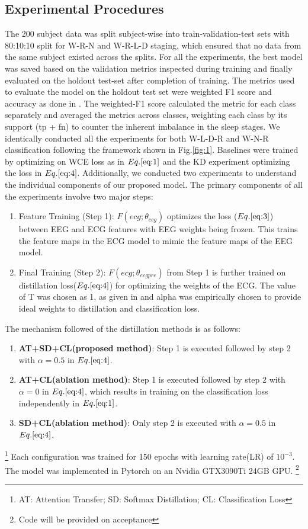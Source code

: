 \documentclass[letterpaper, 10 pt, conference]{ieeeconf}
\begin{document}
\subsection{Experimental Procedures}
The 200 subject data was split subject-wise into train-validation-test sets with 80:10:10 split for W-R-N and W-R-L-D staging, which ensured that no data from the same subject existed across the splits. For all the experiments, the best model was saved based on the validation metrics inspected during training and finally evaluated on the holdout test-set after completion of training. The metrics used to evaluate the model on the holdout test set were weighted F1 score and accuracy as done in \cite{perslev2019u}. The weighted-F1 score calculated the metric for each class separately and averaged the metrics across classes, weighting each class by its support (tp + fn) to counter the inherent imbalance in the sleep stages. We identically conducted all the experiments for both W-L-D-R and W-N-R classification following the framework shown in Fig.\ref{fig:1}. Baselines were trained by optimizing on WCE loss as in $Eq.\ref{eq:1}$ and the KD experiment optimizing the loss in $Eq.\ref{eq:4}$. Additionally, we conducted two experiments to understand the individual components of our proposed model. The primary components of all the experiments involve two major steps:
\begin{enumerate}
    \item Feature Training (Step 1): $F(ecg; \theta_{ecg})$ optimizes the loss ($Eq.\ref{eq:3}$) between EEG and ECG features with EEG weights being frozen. This trains the feature maps in the ECG model to mimic the feature maps of the EEG model.
    \item Final Training (Step 2): $F(ecg;\theta_{ecgpre})$ from Step 1 is further trained on distillation loss($Eq.\ref{eq:4}$) for optimizing the weights of the ECG. The value of T was chosen as 1, as given in \cite{hinton2015distilling} and alpha was empirically chosen to provide ideal weights to distillation and classification loss.
\end{enumerate}
The mechanism followed of the distillation methods is as follows:

\begin{enumerate}
    \item \textbf{AT+SD+CL(proposed method)}: Step 1 is executed followed by step 2 with $ \alpha = 0.5$ in $Eq.\ref{eq:4}$.
    \item \textbf{AT+CL(ablation method)}: Step 1 is executed followed by step 2 with $ \alpha = 0$ in $Eq.\ref{eq:4}$, which results in training on the classification loss independently in $Eq.\ref{eq:1}$.
    \item \textbf{SD+CL(ablation method)}: Only step 2 is executed with $ \alpha = 0.5$ in $Eq.\ref{eq:4}$.
\end{enumerate}
\footnote{AT: Attention Transfer; SD: Softmax Distillation; CL: Classification Loss}
Each configuration was trained for 150 epochs with learning  rate(LR) of $10^{-3}$. The model was implemented in Pytorch on an Nvidia GTX3090Ti 24GB GPU. 
\footnote{Code will be provided on acceptance}
\end{document}
